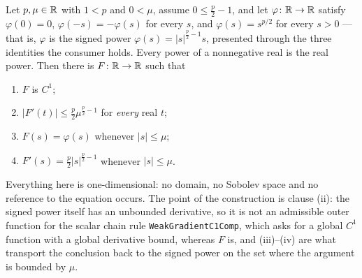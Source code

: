 \begin{helper}
Let $p,\mu\in\mathbb{R}$ with $1<p$ and $0<\mu$, assume $0\le\frac p2-1$, and let
$\varphi\colon\mathbb{R}\to\mathbb{R}$ satisfy $\varphi(0)=0$, $\varphi(-s)=-\varphi(s)$ for
every $s$, and $\varphi(s)=s^{p/2}$ for every $s>0$ --- that is, $\varphi$ is
the signed power $\varphi(s)=|s|^{\frac p2-1}s$, presented through the three
identities the consumer holds.  Every power of a nonnegative real is the real
power.  Then there is $F\colon\mathbb{R}\to\mathbb{R}$ such that
\begin{enumerate}
\item[(i)] $F$ is $C^1$;
\item[(ii)] $|F'(t)|\le\frac p2\mu^{\frac p2-1}$ for \emph{every} real $t$;
\item[(iii)] $F(s)=\varphi(s)$ whenever $|s|\le\mu$;
\item[(iv)] $F'(s)=\frac p2|s|^{\frac p2-1}$ whenever $|s|\le\mu$.
\end{enumerate}
Everything here is one-dimensional: no domain, no Sobolev space and no
reference to the equation occurs.  The point of the construction is clause
(ii): the signed power itself has an unbounded derivative, so it is not an
admissible outer function for the scalar chain rule
\texttt{WeakGradientC1Comp}, which asks for a global $C^1$ function with a
global derivative bound, whereas $F$ is, and (iii)--(iv) are what transport the
conclusion back to the signed power on the set where the argument is bounded by
$\mu$.
\end{helper}
